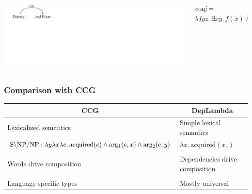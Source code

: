 \documentclass[mathserif,12pt]{beamer}
\newcommand{\hlight}[1]{{\color{blue!80} #1}}
\newcommand{\lx}{\lambda x }
\renewcommand{\land}{\wedge}
\newcommand{\lspace}{.\,}
\begin{document}
\begin{frame}
  \vspace{0.6cm}
 \begin{columns}
  \begin{column}{0.39\textwidth}
   \centering
\includegraphics[trim=1em 9em 28em 0em,clip=true,scale=1.3]{figures/conj}   
  \end{column}
  \begin{column}{0.61\textwidth}
\large    $\textsl{conj} =$ \\ $ \lambda f g z \lspace \exists x y \lspace f(x) \land g(y) \land \mathrm{coord}(z,x,y)$ 
  \end{column}
 \end{columns}
\end{frame}

\begin{frame}
\frametitle{Comparison with CCG}
\large
\vspace{-1em}
\begin{center}
\begin{tabular}{p{5.6cm}|p{5.6cm}}
 \multicolumn{1}{c|}{\hlight{CCG}} & \multicolumn{1}{c}{\hlight{DepLambda}} \\
 \midrule
 Lexicalized semantics & Simple lexical semantics \\
 \scriptsize $\hbox{S} \backslash \hbox{NP}/ \hbox{NP} : \lambda y \lambda x \lambda e \lspace \mathrm{acquired}(e) \land \mathrm{arg_1}(e, x) \land \mathrm{arg_2}(e, y)$  & \scriptsize $\lx \lspace \mathrm{acquired}(x_e)$ \\ 
\\
 Words drive composition & Dependencies drive composition \\
\\
 Language specific types & Mostly universal \\
 
\end{tabular}
\end{center}
\end{frame}
\end{document}
